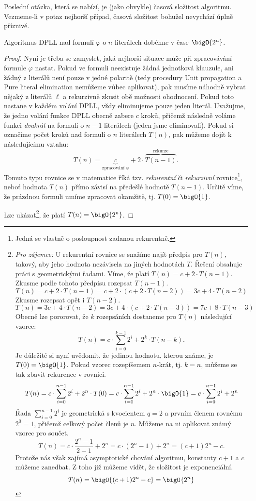 Poslední otázka, která se nabízí, je (jako obvykle) časová složitost algoritmu. Vezmeme-li v potaz nejhorší případ, časová složitost bohužel nevychází úplně příznivě.
\begin{theorem}
    Algoritmus DPLL nad formulí $\varphi$ o $n$ literálech doběhne v čase $\bigO{2^n}$.
\end{theorem}
\begin{proof}
    Nyní je třeba se zamyslet, jaká nejhorší situace může při zpracovávání formule $\varphi$ nastat. Pokud ve formuli neexistuje žádná jednotková klauzule, ani žádný z literálů není pouze v jedné polaritě (tedy procedury Unit propagation a Pure literal elimination nemůžeme vůbec aplikovat), pak musíme náhodně vybrat nějaký z literálů $\ell$ a rekurzivně zkusit obě možnosti ohodnocení. Pokud toto nastane v každém volání DPLL, vždy eliminujeme pouze jeden literál. Uvažujme, že jedno volání funkce DPLL obecně zabere $c$ kroků, přičemž následně voláme funkci \emph{dvakrát} na formuli o $n-1$ literálech (jeden jsme eliminovali). Pokud si označíme počet kroků nad formulí o $n$ literálech $T(n)$, pak můžeme dojít k následujícímu vztahu:
    \[T(n)=\underbrace{c}_{\text{zpracování $\varphi$}}+2\cdot \overbrace{T(n-1)}^{\text{rekurze}}.\]
    Tomuto typu rovnice se v matematice říká tzv. \emph{rekurentní} či \emph{rekurzivní} rovnice\footnote{Jedná se vlastně o posloupnost zadanou rekurentně.}, neboť hodnota $T(n)$ přímo závisí na předešlé hodnotě $T(n-1)$. Určitě víme, že prázdnou formuli umíme zpracovat okamžitě, tj. $T(0)=\bigO{1}$.

    Lze ukázat\footnote{
        \emph{Pro zájemce:} U rekurentní rovnice se snažíme najít předpis pro $T(n)$, takový, aby jeho hodnota nezávisela na jiných hodnotách $T$. Řešení obsahuje práci s geometrickými řadami. Víme, že platí $T(n)=c+2\cdot T(n-1)$. Zkusme podle tohoto předpisu rozepsat $T(n-1)$.
        \[T(n)=c+2\cdot T(n-1)=c+2\cdot(c+2\cdot T(n-2))=3c+4\cdot T(n-2)\]
        Zkusme rozepsat opět i $T(n-2)$.
        \[T(n)=3c+4\cdot T(n-2)=3c+4\cdot(c+2\cdot T(n-3))=7c+8\cdot T(n-3)\]
        Obecně lze pororovat, že $k$ rozepsáních dostaneme pro $T(n)$ následující vzorec:
        \[T(n)=c\cdot\sum_{i=0}^{k-1}2^i+2^k\cdot T(n-k).\]
        Je důležité si nyní uvědomit, že jedinou hodnotu, kterou známe, je $T(0)=\bigO{1}$. Pokud vzorec rozepíšemem $n$-krát, tj. $k=n$, můžeme se tak zbavit rekurence v rovnici.
        \[T(n)=c\cdot\sum_{i=0}^{n-1}2^i+2^n\cdot T(0)=c\cdot\sum_{i=0}^{n-1}2^i+2^n\cdot \bigO{1}=c\cdot\sum_{i=0}^{n-1}2^i+2^n\]
        Řada $\sum_{i=0}^{n-1}2^i$ je geometrická s kvocientem $q=2$ a prvním členem rovnému $2^0=1$, přičemž celkový počet členů je $n$. Můžeme na ni aplikovat známý vzorec pro součet.
        \[T(n)=c\cdot\dfrac{2^n-1}{2-1}+2^n=c\cdot(2^n-1)+2^n=(c+1)2^n-c.\]
        Protože nás však zajímá asymptotické chování algoritmu, konstanty $c+1$ a $c$ můžeme zanedbat. Z toho již můžeme vidět, že složitost je exponenciální.
        \[T(n)=\bigO{(c+1)2^n-c}=\bigO{2^n}\]
    }, že platí $T(n)=\bigO{2^n}$.
\end{proof}

